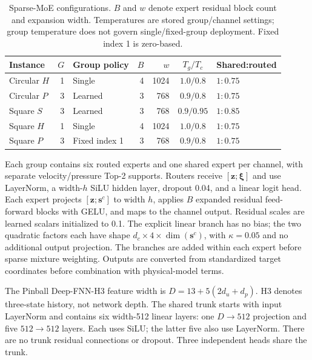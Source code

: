 \begin{table}[t]
\centering
\small
\setlength{\tabcolsep}{4pt}
\caption{Sparse-MoE configurations. $B$ and $w$ denote expert residual
block count and expansion width. Temperatures are stored group/channel
settings; group temperature does not govern single/fixed-group deployment.
Fixed index 1 is zero-based.}
\label{tab:sparse_architecture_settings}
\begin{tabular}{@{}lrlrrcl@{}}
\toprule
Instance & $G$ & Group policy & $B$ & $w$ & $T_g/T_c$ & Shared:routed\\
\midrule
Circular $H$ & 1 & Single & 4 & 1024 & $1.0/0.8$ & $1:0.75$\\
Circular $P$ & 3 & Learned & 3 & 768 & $0.9/0.8$ & $1:0.75$\\
Square $S$ & 3 & Learned & 3 & 768 & $0.9/0.95$ & $1:0.85$\\
Square $H$ & 1 & Single & 4 & 1024 & $1.0/0.8$ & $1:0.75$\\
Square $P$ & 3 & Fixed index 1 & 3 & 768 & $0.9/0.8$ & $1:0.75$\\
\bottomrule
\end{tabular}
\end{table}

Each group contains six routed experts and one shared expert per
channel, with separate velocity/pressure Top-2 supports. Routers
receive $[\bm z;\bm\xi]$ and use LayerNorm, a width-$h$ SiLU hidden
layer, dropout 0.04, and a linear logit head. Each expert projects
$[\bm z;\bm s^c]$ to width $h$, applies $B$ expanded residual
feed-forward blocks with GELU, and maps to the channel output.
Residual scales are learned scalars initialized to 0.1.
The explicit linear branch has no bias; the two quadratic factors
each have shape $d_c\times4\times\dim(\bm s^c)$, with
$\kappa=0.05$ and no additional output projection. The branches are
added within each expert before sparse mixture weighting. Outputs
are converted from standardized target coordinates before combination
with physical-model terms.

The Pinball Deep-FNN-H3 feature width is $D=13+5(2d_u+d_p)$.
H3 denotes three-state history, not network depth. The shared trunk
starts with input LayerNorm and contains six width-512 linear layers:
one $D\to512$ projection and five $512\to512$ layers. Each uses SiLU;
the latter five also use LayerNorm. There are no trunk residual
connections or dropout. Three independent heads share the trunk.

